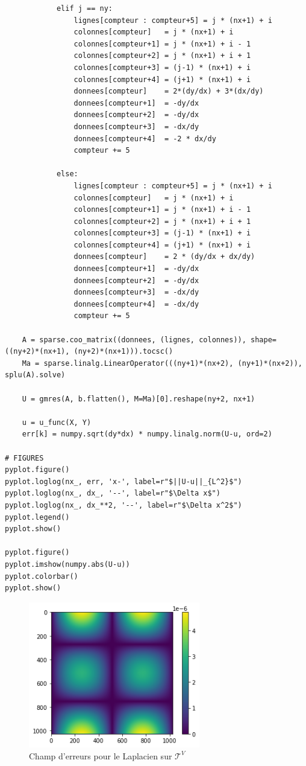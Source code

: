 \begin{verbatim}
            elif j == ny:
                lignes[compteur : compteur+5] = j * (nx+1) + i
                colonnes[compteur]   = j * (nx+1) + i
                colonnes[compteur+1] = j * (nx+1) + i - 1
                colonnes[compteur+2] = j * (nx+1) + i + 1
                colonnes[compteur+3] = (j-1) * (nx+1) + i
                colonnes[compteur+4] = (j+1) * (nx+1) + i
                donnees[compteur]    = 2*(dy/dx) + 3*(dx/dy)
                donnees[compteur+1]  = -dy/dx
                donnees[compteur+2]  = -dy/dx
                donnees[compteur+3]  = -dx/dy
                donnees[compteur+4]  = -2 * dx/dy
                compteur += 5

            else:
                lignes[compteur : compteur+5] = j * (nx+1) + i
                colonnes[compteur]   = j * (nx+1) + i
                colonnes[compteur+1] = j * (nx+1) + i - 1
                colonnes[compteur+2] = j * (nx+1) + i + 1
                colonnes[compteur+3] = (j-1) * (nx+1) + i
                colonnes[compteur+4] = (j+1) * (nx+1) + i
                donnees[compteur]    = 2 * (dy/dx + dx/dy)
                donnees[compteur+1]  = -dy/dx
                donnees[compteur+2]  = -dy/dx
                donnees[compteur+3]  = -dx/dy
                donnees[compteur+4]  = -dx/dy
                compteur += 5

    A = sparse.coo_matrix((donnees, (lignes, colonnes)), shape=((ny+2)*(nx+1), (ny+2)*(nx+1))).tocsc()
    Ma = sparse.linalg.LinearOperator(((ny+1)*(nx+2), (ny+1)*(nx+2)), splu(A).solve)
    
    U = gmres(A, b.flatten(), M=Ma)[0].reshape(ny+2, nx+1)
    
    u = u_func(X, Y)
    err[k] = numpy.sqrt(dy*dx) * numpy.linalg.norm(U-u, ord=2)

# FIGURES
pyplot.figure()
pyplot.loglog(nx_, err, 'x-', label=r"$||U-u||_{L^2}$")
pyplot.loglog(nx_, dx_, '--', label=r"$\Delta x$")
pyplot.loglog(nx_, dx_**2, '--', label=r"$\Delta x^2$")
pyplot.legend()
pyplot.show()

pyplot.figure()
pyplot.imshow(numpy.abs(U-u))
pyplot.colorbar()
pyplot.show()
\end{verbatim}

\begin{figure}[htp]
    \centering
    \includegraphics[width=7.5cm]{Images/stokes/Laplace Dirichlet 2D (V)/erreur.png}
    \caption{Champ d'erreurs pour le Laplacien sur $\mathcal{T}^V$}
\end{figure}

